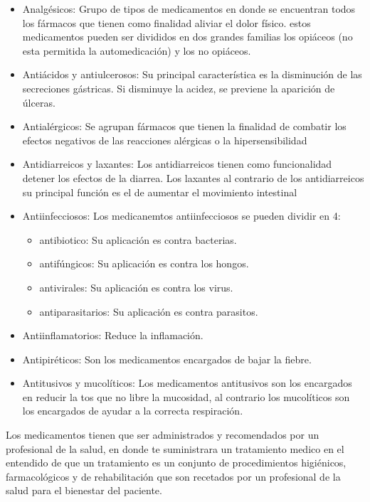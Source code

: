 \begin{itemize}
	\item Analgésicos: Grupo de tipos de medicamentos en donde se encuentran todos los fármacos que tienen como finalidad aliviar el dolor físico. estos medicamentos pueden ser divididos en dos grandes familias los opiáceos (no esta permitida la automedicación) y los no opiáceos.
		
	\item Antiácidos y antiulcerosos: Su principal característica es la disminución de las secreciones gástricas. Si disminuye la acidez, se previene la aparición de úlceras.
	
	\item Antialérgicos: Se agrupan fármacos que tienen la finalidad de combatir los efectos negativos de las reacciones alérgicas o la hipersensibilidad
	
	\item Antidiarreicos y laxantes: Los antidiarreicos tienen como funcionalidad detener los efectos de la diarrea. Los laxantes al contrario de los antidiarreicos su principal función es el de aumentar el movimiento intestinal
	
	\item Antiinfecciosos: Los medicanemtos antiinfecciosos se pueden dividir en 4:
		\begin{itemize}
			\item antibiotico: Su aplicación es contra bacterias.
			\item antifúngicos: Su aplicación es contra los hongos.
			\item antivirales: Su aplicación es contra los virus.
			\item antiparasitarios: Su aplicación es contra parasitos.
		\end{itemize}
	
	\item Antiinflamatorios: Reduce la inflamación.
	
	\item Antipiréticos: Son los medicamentos encargados de bajar la fiebre.
	
	\item Antitusivos y mucolíticos: Los medicamentos antitusivos son los encargados en reducir la tos que no libre la mucosidad, al contrario los mucolíticos son los encargados de ayudar a la correcta respiración.
	 
\end{itemize}
Los medicamentos tienen que ser administrados y recomendados por un profesional de la salud, en donde te suministrara un tratamiento medico en el entendido de que un tratamiento es un conjunto de procedimientos higiénicos, farmacológicos y de rehabilitación que son recetados por un profesional de la salud para el bienestar del paciente. 

